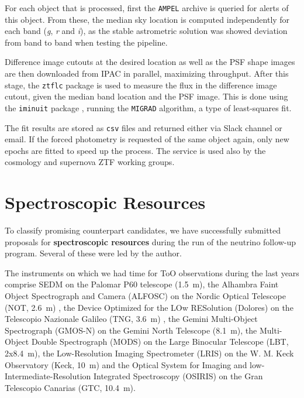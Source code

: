 For each object that is processed, first the \texttt{AMPEL} archive is queried for alerts of this object. From these, the median sky location is computed independently for each band (\textit{g}, \textit{r} and \textit{i}), as the stable astrometric solution was showed deviation from band to band when testing the pipeline.

Difference image cutouts at the desired location as well as the PSF shape images are then downloaded from IPAC in parallel, maximizing throughput. After this stage, the \texttt{ztflc} package is used to measure the flux in the difference image cutout, given the median band location and the PSF image. This is done using the \texttt{iminuit} package , running the \texttt{MIGRAD}  algorithm, a type of least-squares fit.

The fit results are stored as \texttt{csv} files and returned either via Slack channel or email. If the forced photometry is requested of the same object again, only new epochs are fitted to speed up the process. The service is used also by the cosmology and supernova ZTF working groups.

\section{Spectroscopic Resources} \label{spec_resources}
To classify promising counterpart candidates, we have successfully submitted proposals for \textbf{spectroscopic resources} during the run of the neutrino follow-up program. Several of these were led by the author.

The instruments on which we had time for ToO observations during the last years comprise SEDM on the Palomar P60 telescope (\SI{1.5}{\meter}), the Alhambra Faint Object Spectrograph and Camera (ALFOSC) on the Nordic Optical Telescope (NOT, \SI{2.6}{\meter}) , the Device Optimized for the LOw RESolution (Dolores) on the Telescopio Nazionale Galileo (TNG, \SI{3.6}{\meter}) , the Gemini Multi-Object Spectrograph (GMOS-N)  on the Gemini North Telescope (\SI{8.1}{\meter}), the Multi-Object Double Spectrograph (MODS)  on the Large Binocular Telescope (LBT, 2x\SI{8.4}{\meter}), the Low-Resolution Imaging Spectrometer (LRIS)  on the W. M. Keck Observatory (Keck, \SI{10}{\meter}) and the Optical System for Imaging and low-Intermediate-Resolution Integrated Spectroscopy (OSIRIS)  on the Gran Telescopio Canarias (GTC, \SI{10.4}{\meter}).

